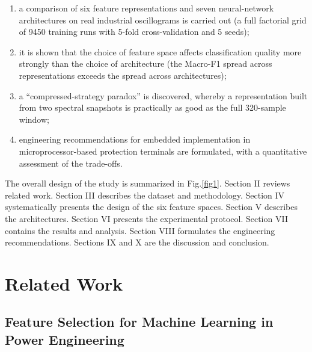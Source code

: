 \documentclass{ieeeojies}
\begin{document}
\begin{enumerate}
\item a comparison of six feature representations and seven neural-network architectures on real industrial oscillograms is carried out (a full factorial grid of 9450 training runs with 5-fold cross-validation and 5 seeds);
\item it is shown that the choice of feature space affects classification quality more strongly than the choice of architecture (the Macro-F1 spread across representations exceeds the spread across architectures);
\item a ``compressed-strategy paradox'' is discovered, whereby a representation built from two spectral snapshots is practically as good as the full 320-sample window;
\item engineering recommendations for embedded implementation in microprocessor-based protection terminals are formulated, with a quantitative assessment of the trade-offs.
\end{enumerate}

The overall design of the study is summarized in Fig.\ref{fig1}. Section II reviews related work. Section III describes the dataset and methodology. Section IV systematically presents the design of the six feature spaces. Section V describes the architectures. Section VI presents the experimental protocol. Section VII contains the results and analysis. Section VIII formulates the engineering recommendations. Sections IX and X are the discussion and conclusion.

\section{Related Work}

\subsection{Feature Selection for Machine Learning in Power Engineering}
\end{document}
